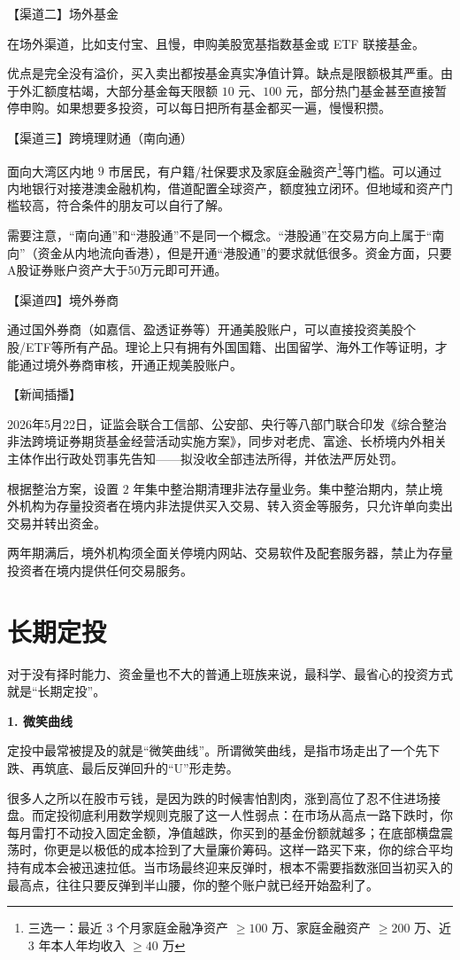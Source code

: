 \documentclass[12pt,openany]{book}
\newcommand{\subhead}[1]{%
    \par\vspace{0.5\baselineskip}%
    \noindent\textbf{#1}\par%
    \vspace{0.5\baselineskip}%
}
\begin{document}
【渠道二】场外基金

在场外渠道，比如支付宝、且慢，申购美股宽基指数基金或 ETF 联接基金。

优点是完全没有溢价，买入卖出都按基金真实净值计算。缺点是限额极其严重。由于外汇额度枯竭，大部分基金每天限额 $10$ 元、$100$ 元，部分热门基金甚至直接暂停申购。如果想要多投资，可以每日把所有基金都买一遍，慢慢积攒。

【渠道三】跨境理财通（南向通）

面向大湾区内地 $9$ 市居民，有户籍/社保要求及家庭金融资产\footnote{三选一：最近 3 个月家庭金融净资产 $\ge 100$ 万、家庭金融资产 $\ge 200$ 万、近 3 年本人年均收入 $\ge 40$ 万}等门槛。可以通过内地银行对接港澳金融机构，借道配置全球资产，额度独立闭环。但地域和资产门槛较高，符合条件的朋友可以自行了解。

需要注意，“南向通”和“港股通”不是同一个概念。“港股通”在交易方向上属于“南向”（资金从内地流向香港），但是开通“港股通”的要求就低很多。资金方面，只要A股证券账户资产大于50万元即可开通。

【渠道四】境外券商

通过国外券商（如嘉信、盈透证券等）开通美股账户，可以直接投资美股个股/ETF等所有产品。理论上只有拥有外国国籍、出国留学、海外工作等证明，才能通过境外券商审核，开通正规美股账户。

\newpage

【新闻插播】

2026年5月22日，证监会联合工信部、公安部、央行等八部门联合印发《综合整治非法跨境证券期货基金经营活动实施方案》，同步对老虎、富途、长桥境内外相关主体作出行政处罚事先告知——拟没收全部违法所得，并依法严厉处罚。

根据整治方案，设置 $2$ 年集中整治期清理非法存量业务。集中整治期内，禁止境外机构为存量投资者在境内非法提供买入交易、转入资金等服务，只允许单向卖出交易并转出资金。

两年期满后，境外机构须全面关停境内网站、交易软件及配套服务器，禁止为存量投资者在境内提供任何交易服务。

\section{长期定投}

对于没有择时能力、资金量也不大的普通上班族来说，最科学、最省心的投资方式就是“长期定投”。

\subhead{1. 微笑曲线}

定投中最常被提及的就是“微笑曲线”。所谓微笑曲线，是指市场走出了一个先下跌、再筑底、最后反弹回升的“U”形走势。

很多人之所以在股市亏钱，是因为跌的时候害怕割肉，涨到高位了忍不住进场接盘。而定投彻底利用数学规则克服了这一人性弱点：在市场从高点一路下跌时，你每月雷打不动投入固定金额，净值越跌，你买到的基金份额就越多；在底部横盘震荡时，你更是以极低的成本捡到了大量廉价筹码。这样一路买下来，你的综合平均持有成本会被迅速拉低。当市场最终迎来反弹时，根本不需要指数涨回当初买入的最高点，往往只要反弹到半山腰，你的整个账户就已经开始盈利了。
\end{document}
